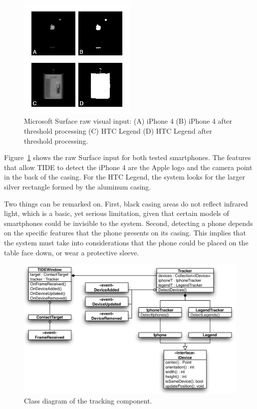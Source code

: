 \begin{figure}[htbp]
  \centering
    \includegraphics[width=0.5\textwidth]{images/msRaw}
    \caption{Microsoft Surface raw visual input: (A) iPhone 4 (B) iPhone 4 after threshold processing (C) HTC Legend (D) HTC Legend after threshold processing.}
    \label{fig:msRaw}
\end{figure}

Figure~\ref{fig:msRaw} shows the raw Surface input for both tested smartphones.
The features that allow TIDE to detect the iPhone 4 are the Apple logo and the camera point in the back of the casing.
For the HTC Legend, the system looks for the larger silver rectangle formed by the aluminum casing.

Two things can be remarked on.
First, black casing areas do not reflect infrared light, which is a basic, yet serious limitation, given that certain models of smartphones could be invisible to the system.
Second, detecting a phone depends on the specific features that the phone presents on its casing.
This implies that the system must take into considerations that the phone could be placed on the table face down, or wear a protective sleeve.

\begin{figure}[htbp]
  \centering
    \includegraphics[width=1\textwidth]{images/trackingDiagram}
    \caption{Class diagram of the tracking component.}
    \label{fig:trackingDiagram}
\end{figure}

